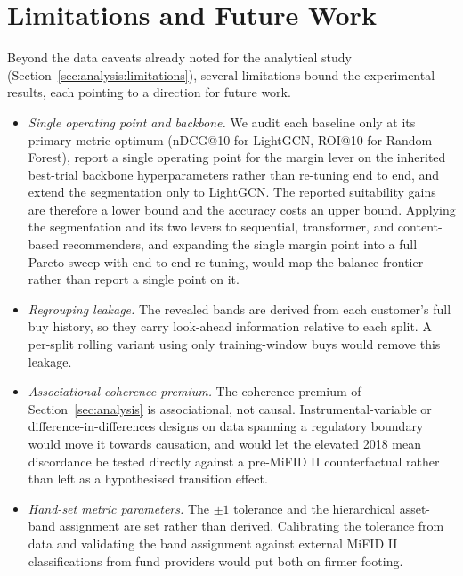 \section{Limitations and Future Work}
\label{sec:futurework}

Beyond the data caveats already noted for the analytical study (Section~\ref{sec:analysis:limitations}), several limitations bound the experimental results, each pointing to a direction for future work.

\begin{itemize}
    \item \textit{Single operating point and backbone.} We audit each baseline only at its primary-metric optimum (nDCG@10 for LightGCN, ROI@10 for Random Forest), report a single operating point for the margin lever on the inherited best-trial backbone hyperparameters rather than re-tuning end to end, and extend the segmentation only to LightGCN. The reported suitability gains are therefore a lower bound and the accuracy costs an upper bound. Applying the segmentation and its two levers to sequential, transformer, and content-based recommenders, and expanding the single margin point into a full Pareto sweep with end-to-end re-tuning, would map the balance frontier rather than report a single point on it.
    \item \textit{Regrouping leakage.} The revealed bands are derived from each customer's full buy history, so they carry look-ahead information relative to each split. A per-split rolling variant using only training-window buys would remove this leakage.
    \item \textit{Associational coherence premium.} The coherence premium of Section~\ref{sec:analysis} is associational, not causal. Instrumental-variable or difference-in-differences designs on data spanning a regulatory boundary would move it towards causation, and would let the elevated 2018 mean discordance be tested directly against a pre-MiFID II counterfactual rather than left as a hypothesised transition effect.
    \item \textit{Hand-set metric parameters.} The $\pm 1$ tolerance and the hierarchical asset-band assignment are set rather than derived. Calibrating the tolerance from data and validating the band assignment against external MiFID II classifications from fund providers would put both on firmer footing.
\end{itemize}
